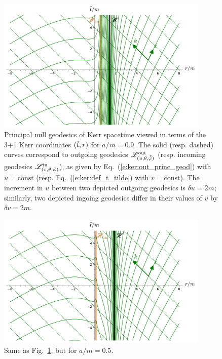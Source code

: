 \begin{figure}
\centerline{\includegraphics[width=0.9\textwidth]{ker_princ_null_geod_a90.pdf}}
\caption[]{\label{f:ker:princ_null_geod_a90} \footnotesize
Principal null geodesics of Kerr spacetime viewed in terms of the 3+1 Kerr
coordinates $({\tilde t},r)$ for $a/m=0.9$. The solid (resp. dashed) curves
correspond to outgoing geodesics $\mathscr{L}^{\rm out}_{(u,\theta,\tilde{{\tilde\varphi}})}$
(resp. incoming geodesics $\mathscr{L}^{\rm in}_{(v,\theta,{\tilde\varphi})}$), as given by
Eq.~(\ref{e:ker:out_princ_geod}) with $u=\mathrm{const}$
(resp. Eq.~(\ref{e:ker:def_t_tilde}) with $v=\mathrm{const}$). The increment
in $u$ between two depicted outgoing geodesics is $\delta u = 2m$;
similarly, two depicted ingoing geodesics differ in their values of
$v$ by $\delta v = 2m$.
}
\end{figure}

\begin{figure}
\centerline{\includegraphics[width=0.9\textwidth]{ker_princ_null_geod_a50.pdf}}
\caption[]{\label{f:ker:princ_null_geod_a50} \footnotesize
Same as Fig.~\ref{f:ker:princ_null_geod_a90}, but for $a/m=0.5$.}
\end{figure}

